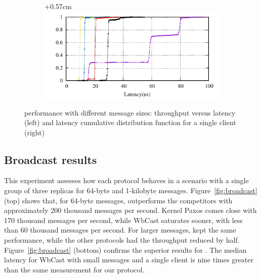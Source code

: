 \begin{figure}[htp!]
\begin{subfigure}{\columnwidth}
  \end{subfigure}
  \begin{subfigure}{\columnwidth}
    \advance\leftskip+0.57cm
    \includegraphics[width=0.96\columnwidth]{figures/benchmark/graphs/figure-performance-vs-size-single-group-cdf-from-4k}
  \end{subfigure}
  \caption{\libname performance with different message sizes: throughput versus latency (left) and latency cumulative distribution function for a single client (right)}
  \label{fig:1group_message_size}
\end{figure}

\subsection{Broadcast results}
\label{sec:evaluation:broadcast}

This experiment assesses how each protocol behaves in a scenario with a single group of three replicas for 64-byte and 1-kilobyte messages.
Figure~\ref{fig:broadcast} (top) shows that, for 64-byte messages, \libname outperforms the competitors with approximately 200 thousand messages per second. 
Kernel Paxos comes close with 170 thousand messages per second, while WbCast saturates sooner, with less than 60 thousand messages per second.
For larger messages, \libname kept the same performance, while the other protocols had the throughput reduced by half.
Figure~\ref{fig:broadcast} (bottom) confirms the superior results for \libname. The median latency for WbCast with small messages and a single client is nine times greater than the same measurement for our protocol.

